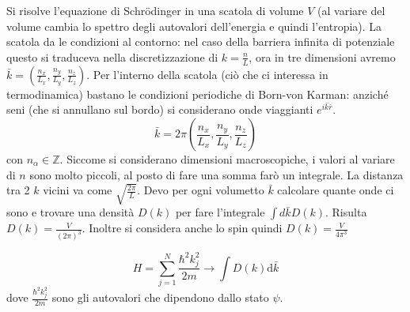 Si risolve l'equazione di Schrödinger in una scatola di volume $V$ (al variare del volume cambia lo spettro degli autovalori dell'energia e quindi l'entropia). La scatola da le condizioni al contorno: nel caso della barriera infinita di potenziale questo si traduceva nella discretizzazione di $k= \frac{n}{L}$, ora in tre dimensioni avremo $\bar k = \left(\frac{n_x}{L_x},\frac{n_y}{L_y}, \frac{n_z}{L_z}\right)$. Per l'interno della scatola (ciò che ci interessa in termodinamica) bastano le condizioni periodiche di Born-von Karman: anziché seni (che si annullano sul bordo) si considerano onde viaggianti $e^{i\bar k \dot \bar r}$.
\begin{equation*}
\bar k=2\pi\left(\frac{n_x}{L_x},\frac{n_y}{L_y},\frac{n_z}{L_z}\right)
\end{equation*}
con $n_{\alpha}\in \mathbb{Z}$.
Siccome si considerano dimensioni macroscopiche, i valori al variare di $n$ sono molto piccoli, al posto di fare una somma farò un integrale. La distanza tra 2 $k$ vicini va come $\sqrt{\frac{2 \pi }{L}}$. Devo per ogni volumetto $ \bar k $ calcolare quante onde ci sono e trovare una densità $ D(k) $ per fare l'integrale $\int d \bar k D(k)$. Risulta $D(k)=\frac{V}{(2\pi)^3}$. Inoltre si considera anche lo spin quindi $D(k)=\frac{V}{4\pi^3}$


\begin{equation}
H=\sum_{j=1}^{N}{\frac{\hbar ^2k_j^2}{2m}}\rightarrow\int{D\left(k\right)\textrm{d} \bar k}
\end{equation}
dove $\frac{\hbar ^2k_j^2}{2m}$ sono gli autovalori che dipendono dallo stato $\psi $.

